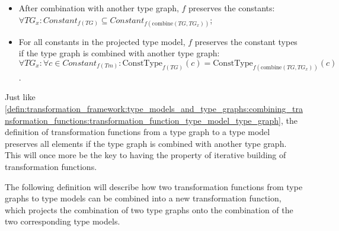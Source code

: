 \begin{defin}
\begin{itemize}
    \item After combination with another type graph, $f$ preserves the constants:\\$\forall TG_x\!: Constant_{f(TG)} \subseteq Constant_{f(\mathrm{combine}(TG, TG_x))}$;
    \item For all constants in the projected type model, $f$ preserves the constant types if the type graph is combined with another type graph:\\$\forall TG_x\!: \forall c \in Constant_{f(Tm)}\!: \mathrm{ConstType}_{f(TG)}(c) = \mathrm{ConstType}_{f(\mathrm{combine}(TG, TG_x))}(c)$.
\end{itemize}
\end{defin}

Just like \cref{defin:transformation_framework:type_models_and_type_graphs:combining_transformation_functions:transformation_function_type_model_type_graph}, the definition of transformation functions from a type graph to a type model preserves all elements if the type graph is combined with another type graph. This will once more be the key to having the property of iterative building of transformation functions.

The following definition will describe how two transformation functions from type graphs to type models can be combined into a new transformation function, which projects the combination of two type graphs onto the combination of the two corresponding type models.

